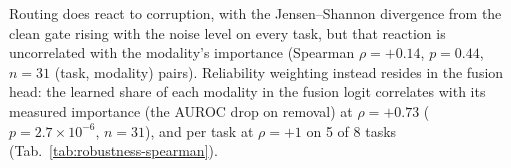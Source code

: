 Routing does react to corruption, with the Jensen--Shannon divergence from the clean gate rising with the noise level on every task, but that reaction is uncorrelated with the modality's importance (Spearman $\rho=+0.14$, $p=0.44$, $n=31$ (task, modality) pairs). Reliability weighting instead resides in the fusion head: the learned share of each modality in the fusion logit correlates with its measured importance (the AUROC drop on removal) at $\rho=+0.73$ ($p=2.7\times10^{-6}$, $n=31$), and per task at $\rho=+1$ on 5 of 8 tasks (Tab.~\ref{tab:robustness-spearman}).
